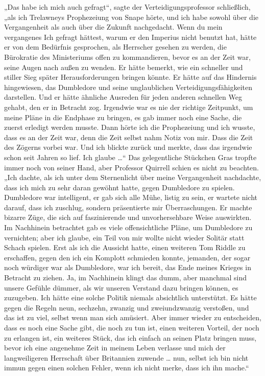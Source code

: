 „Das habe ich mich auch gefragt“, sagte der Verteidigungsprofessor schließlich, „als ich Trelawneys Prophezeiung von Snape hörte, und ich habe sowohl über die Vergangenheit als auch über die Zukunft nachgedacht. Wenn du mein vergangenes Ich gefragt hättest, warum er den Imperius nicht benutzt hat, hätte er von dem Bedürfnis gesprochen, als Herrscher gesehen zu werden, die Bürokratie des Ministeriums offen zu kommandieren, bevor es an der Zeit war, seine Augen nach außen zu wenden. Er hätte bemerkt, wie ein schneller und stiller Sieg später Herausforderungen bringen könnte. Er hätte auf das Hindernis hingewiesen, das Dumbledore und seine unglaublichen Verteidigungsfähigkeiten darstellen. Und er hätte ähnliche Ausreden für jeden anderen schnellen Weg gehabt, den er in Betracht zog. Irgendwie war es nie der richtige Zeitpunkt, um meine Pläne in die Endphase zu bringen, es gab immer noch eine Sache, die zuerst erledigt werden musste. Dann hörte ich die Prophezeiung und ich wusste, dass es an der Zeit war, denn die Zeit selbst nahm Notiz von mir. Dass die Zeit des Zögerns vorbei war. Und ich blickte zurück und merkte, dass das irgendwie schon seit Jahren so lief. Ich glaube …“
Das gelegentliche Stückchen Gras tropfte immer noch von seiner Hand, aber Professor Quirrell schien es nicht zu beachten.
„Ich dachte, als ich unter dem Sternenlicht über meine Vergangenheit nachdachte, dass ich mich zu sehr daran gewöhnt hatte, gegen Dumbledore zu spielen. Dumbledore war intelligent, er gab sich alle Mühe, listig zu sein, er wartete nicht darauf, dass ich zuschlug, sondern präsentierte mir Überraschungen. Er machte bizarre Züge, die sich auf faszinierende und unvorhersehbare Weise auswirkten. Im Nachhinein betrachtet gab es viele offensichtliche Pläne, um Dumbledore zu vernichten; aber ich glaube, ein Teil von mir wollte nicht wieder Solitär statt Schach spielen. Erst als ich die Aussicht hatte, einen weiteren Tom Riddle zu erschaffen, gegen den ich ein Komplott schmieden konnte, jemanden, der sogar noch würdiger war als Dumbledore, war ich bereit, das Ende meines Krieges in Betracht zu ziehen. Ja, im Nachhinein klingt das dumm, aber manchmal sind unsere Gefühle dümmer, als wir unseren Verstand dazu bringen können, es zuzugeben. Ich hätte eine solche Politik niemals absichtlich unterstützt. Es hätte gegen die Regeln neun, sechzehn, zwanzig und zweiundzwanzig verstoßen, und das ist zu viel, selbst wenn man sich amüsiert. Aber immer wieder zu entscheiden, dass es noch eine Sache gibt, die noch zu tun ist, einen weiteren Vorteil, der noch zu erlangen ist, ein weiteres Stück, das ich einfach an seinen Platz bringen muss, bevor ich eine angenehme Zeit in meinem Leben verlasse und mich der langweiligeren Herrschaft über Britannien zuwende … nun, selbst ich bin nicht immun gegen einen solchen Fehler, wenn ich nicht merke, dass ich ihn mache.“

